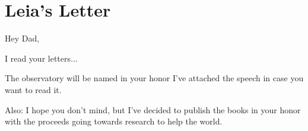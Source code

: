 \chapter{Leia's Letter}
Hey Dad,

I read your letters...

The observatory will be named in your honor
I've attached the speech in case you want to read it.

Also: I hope you don't mind, but I've decided to publish the books in your honor with the proceeds going towards research to help the world.
